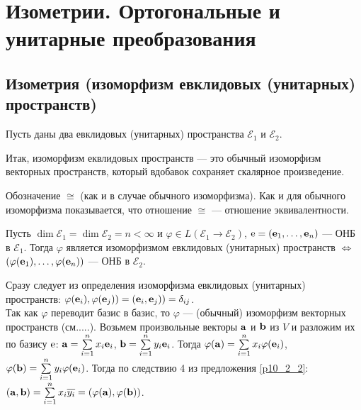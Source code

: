 \section{Изометрии. Ортогональные  и унитарные преобразования}

\subsection{Изометрия (изоморфизм евклидовых (унитарных) пространств)}

Пусть даны два евклидовых (унитарных) пространства $\mathcal{E}_1$ и $\mathcal{E}_2$.


Итак, изоморфизм еквлидовых пространств  --- это обычный изоморфизм векторных пространств, который вдобавок сохраняет скалярное произведение.


Обозначение $\cong$ (как и в случае обычного изоморфизма).
Как и для обычного изоморфизма показывается, что отношение $\cong$ --- отношение эквивалентности.


\begin{predl}\label{p10_2_3} 
Пусть $\dim \mathcal{E}_1 = \dim \mathcal{E}_2 = n<\infty $ и 
$\varphi \in L(\mathcal{E}_1\to \mathcal{E}_2)$, $\mathrm{e} = (\mathbf{e}_1, \ldots, \mathbf{e}_n)$ --- ОНБ в $\mathcal{E}_1$.
Тогда $\varphi$ является изоморфизмом евклидовых (унитарных) пространств $\Leftrightarrow$ $(\varphi(\mathbf{e}_1), \ldots, \varphi(\mathbf{e}_n))$ --- ОНБ в $\mathcal{E}_2$. 
\end{predl}
\dok 
\dokright Сразу следует из определения изоморфизма евклидовых (унитарных) пространств:
$\varphi(\mathbf{e}_i), \varphi(\mathbf{e}_j)) = (\mathbf{e}_i, \mathbf{e}_j)) = \delta_{ij}$.\\
\dokleft Так как $\varphi$ переводит базис в базис, то $\varphi$ --- (обычный) изоморфизм векторных пространств (см.....).
Возьмем произвольные векторы $\mathbf{a}$ и  $\mathbf{b}$ из $V$ и разложим их по базису $\mathrm{e}$:
$\mathbf{a} = \sum\limits_{i=1}^n x_i \mathbf{e}_i$, $\mathbf{b} = \sum\limits_{i=1}^n y_i \mathbf{e}_i$. Тогда
$\varphi(\mathbf{a}) = \sum\limits_{i=1}^n x_i \varphi(\mathbf{e}_i)$, $\varphi(\mathbf{b}) = \sum\limits_{i=1}^n y_i \varphi(\mathbf{e}_i)$.
Тогда по следствию 4 из предложения \ref{p10_2_2}:
$(\mathbf{a}, \mathbf{b}) = \sum\limits_{i=1}^n x_i\overline{y_i} = (\varphi(\mathbf{a}), \varphi(\mathbf{b}))$.
\edok

